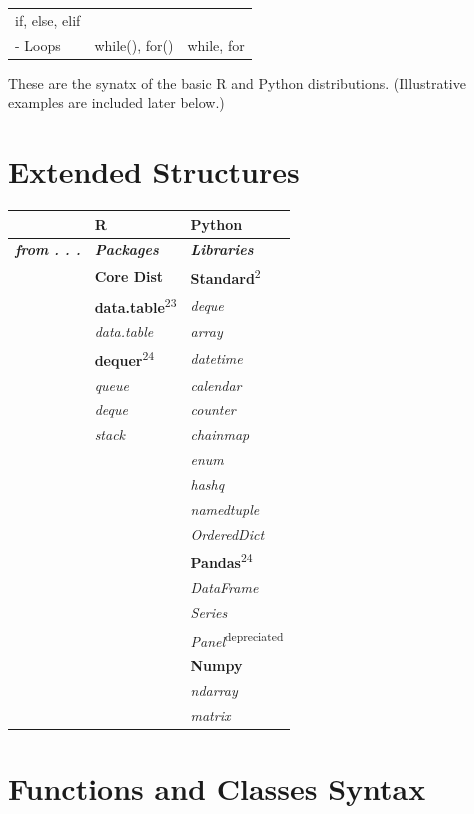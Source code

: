 \documentclass[]{book}
\theoremstyle{definition}
\theoremstyle{definition}
\theoremstyle{definition}
\theoremstyle{remark}
\begin{document}
\begin{longtable}[]{@{}lll@{}}
\begin{minipage}[t]{0.39\columnwidth}
if, else, elif\strut
\end{minipage}\tabularnewline
\begin{minipage}[t]{0.19\columnwidth}\raggedright\strut
- Loops\strut
\end{minipage} & \begin{minipage}[t]{0.33\columnwidth}\raggedright\strut
while(), for()\strut
\end{minipage} & \begin{minipage}[t]{0.39\columnwidth}\raggedright\strut
while, for\strut
\end{minipage}\tabularnewline
\bottomrule
\end{longtable}

These are the synatx of the basic R and Python distributions.
(Illustrative examples are included later below.)

\section{Extended Structures}\label{extended-structures}


\begin{longtable}[]{@{}lll@{}}
\toprule
& R & Python\tabularnewline
\midrule
\endhead
\emph{\textbf{from . . .}} & \emph{\textbf{Packages}} &
\emph{\textbf{Libraries}}\tabularnewline
& \textbf{Core Dist} &
\textbf{Standard}\textsuperscript{2}\tabularnewline
& \textbf{data.table}\textsuperscript{23} & \emph{deque}\tabularnewline
& \emph{data.table} & \emph{array}\tabularnewline
& \textbf{dequer}\textsuperscript{24} & \emph{datetime}\tabularnewline
& \emph{queue} & \emph{calendar}\tabularnewline
& \emph{deque} & \emph{counter}\tabularnewline
& \emph{stack} & \emph{chainmap}\tabularnewline
& & \emph{enum}\tabularnewline
& & \emph{hashq}\tabularnewline
& & \emph{namedtuple}\tabularnewline
& & \emph{OrderedDict}\tabularnewline
& & \textbf{Pandas}\textsuperscript{24}\tabularnewline
& & \emph{DataFrame}\tabularnewline
& & \emph{Series}\tabularnewline
& & \emph{Panel}\textsuperscript{depreciated}\tabularnewline
& & \textbf{Numpy}\tabularnewline
& & \emph{ndarray}\tabularnewline
& & \emph{matrix}\tabularnewline
\bottomrule
\end{longtable}

\section{Functions and Classes
Syntax}\label{functions-and-classes-syntax}
\end{document}
